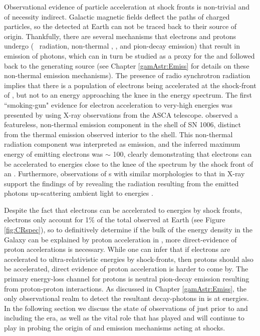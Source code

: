 Observational evidence of particle acceleration at \snr{} shock fronts is non-trivial and of necessity indirect. Galactic magnetic fields deflect the paths of charged particles, so the \crs{} detected at Earth can not be traced back to their source of origin. Thankfully, there are several mechanisms that electrons and protons undergo (\ie{}\ \sync{} radiation, non-thermal \brems{}, \ic{}, and pion-decay emission) that result in emission of photons, which can in turn be studied as a proxy for the \crs{} and followed back to the generating source (see Chapter \ref{gamAstr:Emiss} for details on these non-thermal emission mechanisms). The presence of radio synchrotron radiation implies that there is a population of electrons being accelerated at the shock-front of \snrs{}, but not to an energy approaching the knee in the \cray{} energy spectrum. The first ``smoking-gun" evidence for electron acceleration to very-high energies was presented by \cite{Koyama95} using X-ray observations from the ASCA telescope. \cite{Koyama95} observed a featureless, non-thermal emission component in the shell of SN 1006, distinct from the thermal emission observed interior to the shell. This non-thermal radiation component was interpreted as \sync{} emission, and the inferred maximum energy of emitting electrons was $\sim $ 100\tev{}, clearly demonstrating that electrons can be accelerated to \cray{} energies close to the knee of the \cray{} spectrum by the shock front of an \snr{}. Furthermore,  \snr{} observations of \tev{}  \gam{}s with similar morphologies to that in X-ray support the findings of \cite{Koyama95} by revealing the \ic{} radiation resulting from the \sync{} emitted photons up-scattering ambient light to \tev{} energies \cite{Tanimori98,Aharonian04}.

Despite the fact that electrons can be accelerated to \cray{} energies by \snr{} shock fronts, electrons only account for 1\% of the total \crs{} observed at Earth (see Figure \ref{fig:CRspec}), so to definitively determine if the bulk of the \cray{} energy density in the Galaxy can be explained by \cray{} proton acceleration in \snrs{}, more direct-evidence of proton accelerations is necessary. While one can infer that if electrons are accelerated to ultra-relativistic energies by \snr{} shock-fronts, then protons should also be accelerated, direct evidence of proton acceleration is harder to come by. The primary energy-loss channel for protons is neutral pion-decay emission resulting from proton-proton interactions. As discussed in Chapter \ref{gamAstr:Emiss}, the only observational realm to detect the resultant decay-photons in is at \gam{} energies. In the following section we discuss the state of \gam{} observations of \snrs{} just prior to and including the \Fermi{} era, as well as the vital role that \Fermi{} has played and will continue to play in probing the origin of \crs{} and emission mechanisms acting at \snr{} shocks.

